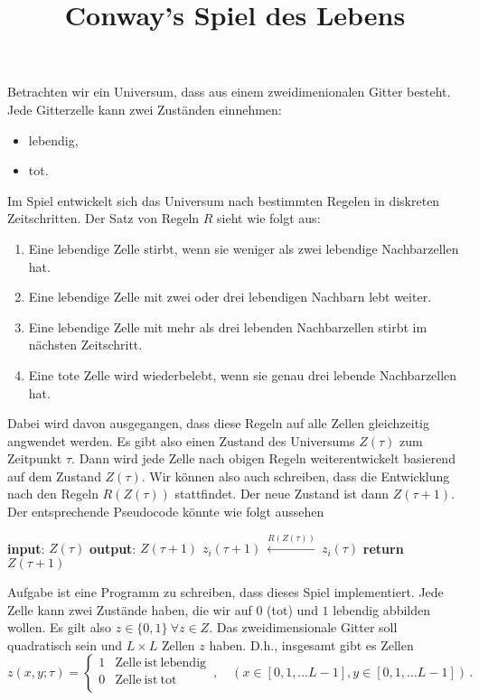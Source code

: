 \documentclass{article}[12pt]
\title{Conway's Spiel des Lebens}
\begin{document}
\maketitle


\noindent Betrachten wir ein \glqq Universum\grqq, dass aus einem zweidimenionalen Gitter besteht.
Jede Gitterzelle kann zwei Zuständen einnehmen:
\begin{itemize}
\item lebendig,
\item tot.
\end{itemize}
Im Spiel entwickelt sich das Universum nach bestimmten Regelen in diskreten Zeitschritten.
Der Satz von Regeln $R$ sieht wie folgt aus:
\begin{enumerate}
\item Eine lebendige Zelle stirbt, wenn sie weniger als zwei lebendige Nachbarzellen hat.
\item Eine lebendige Zelle mit zwei oder drei lebendigen Nachbarn lebt weiter.
\item Eine lebendige Zelle mit mehr als drei lebenden Nachbarzellen stirbt im nächsten Zeitschritt.
\item Eine tote Zelle wird wiederbelebt, wenn sie genau drei lebende Nachbarzellen hat.
\end{enumerate}
Dabei wird davon ausgegangen, dass diese Regeln auf alle Zellen gleichzeitig angwendet werden.
Es gibt also einen Zustand des Universums $Z(\tau)$ zum Zeitpunkt $\tau$.
Dann wird jede Zelle nach obigen Regeln weiterentwickelt basierend auf dem Zustand $Z(\tau)$.
Wir können also auch schreiben, dass die Entwicklung nach den Regeln $R(Z(\tau))$ stattfindet. 
Der neue Zustand ist dann $Z(\tau+1)$. 
Der entsprechende Pseudocode könnte wie folgt aussehen
\begin{algorithmic}[1]
  \State \textbf{input}: $Z(\tau)$
  \State \textbf{output}: $Z(\tau+1)$
  \State $z_i(\tau+1)\ \stackrel{R(Z(\tau))}{\longleftarrow}\ z_i(\tau)$
  \EndFor
  \State \textbf{return} $Z(\tau+1)$
  \EndProcedure
\end{algorithmic}
Aufgabe ist eine Programm zu schreiben, dass dieses Spiel implementiert.
Jede Zelle kann zwei Zustände haben, die wir auf $0$ (tot) und $1$ lebendig abbilden wollen.
Es gilt also $z \in \{0,1\}\ \forall z\in Z$.
Das zweidimensionale Gitter soll quadratisch sein und $L\times L$ Zellen $z$ haben.
D.h., insgesamt gibt es Zellen
\begin{equation}
  z(x,y; \tau) = \begin{cases}
    1 & \mathrm{Zelle~ist~lebendig} \\0  & \mathrm{Zelle~ist~tot} \\
  \end{cases}
  \,,\quad (x\in[0,1,\ldots L-1], y\in[0,1,\ldots L-1])\,.
\end{equation}
\end{document}
